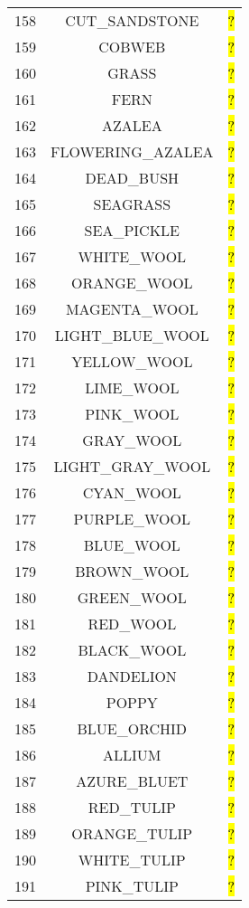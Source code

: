 \documentclass[11pt]{article}
\newcommand\myworries[1]{\sethlcolor{red}\hl{#1}}
\begin{document}
\begin{longtable}{ |c|c|c| }
	158 & CUT\_SANDSTONE & \myworries{?} \\
	159 & COBWEB & \myworries{?} \\
	160 & GRASS & \myworries{?} \\
	161 & FERN & \myworries{?} \\
	162 & AZALEA & \myworries{?} \\
	163 & FLOWERING\_AZALEA & \myworries{?} \\
	164 & DEAD\_BUSH & \myworries{?} \\
	165 & SEAGRASS & \myworries{?} \\
	166 & SEA\_PICKLE & \myworries{?} \\
	167 & WHITE\_WOOL & \myworries{?} \\
	168 & ORANGE\_WOOL & \myworries{?} \\
	169 & MAGENTA\_WOOL & \myworries{?} \\
	170 & LIGHT\_BLUE\_WOOL & \myworries{?} \\
	171 & YELLOW\_WOOL & \myworries{?} \\
	172 & LIME\_WOOL & \myworries{?} \\
	173 & PINK\_WOOL & \myworries{?} \\
	174 & GRAY\_WOOL & \myworries{?} \\
	175 & LIGHT\_GRAY\_WOOL & \myworries{?} \\
	176 & CYAN\_WOOL & \myworries{?} \\
	177 & PURPLE\_WOOL & \myworries{?} \\
	178 & BLUE\_WOOL & \myworries{?} \\
	179 & BROWN\_WOOL & \myworries{?} \\
	180 & GREEN\_WOOL & \myworries{?} \\
	181 & RED\_WOOL & \myworries{?} \\
	182 & BLACK\_WOOL & \myworries{?} \\
	183 & DANDELION & \myworries{?} \\
	184 & POPPY & \myworries{?} \\
	185 & BLUE\_ORCHID & \myworries{?} \\
	186 & ALLIUM & \myworries{?} \\
	187 & AZURE\_BLUET & \myworries{?} \\
	188 & RED\_TULIP & \myworries{?} \\
	189 & ORANGE\_TULIP & \myworries{?} \\
	190 & WHITE\_TULIP & \myworries{?} \\
	191 & PINK\_TULIP & \myworries{?} \\

\end{longtable}
\end{document}
